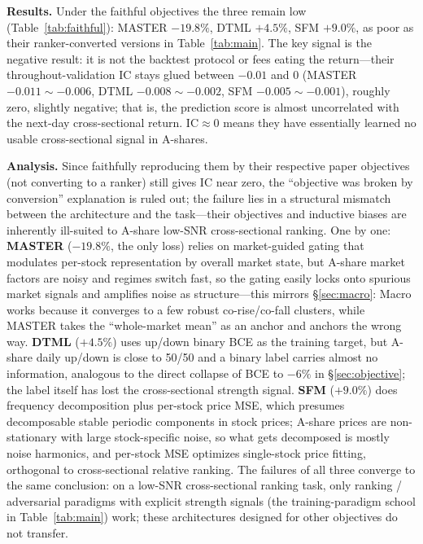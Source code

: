 \documentclass[a4paper,11pt]{article}
\begin{document}
\textbf{Results.} Under the faithful objectives the three remain low
(Table~\ref{tab:faithful}): MASTER $-19.8\%$, DTML $+4.5\%$, SFM $+9.0\%$, as
poor as their ranker-converted versions in Table~\ref{tab:main}. The key signal
is the negative result: it is not the backtest protocol or fees eating the
return---their throughout-validation IC stays glued between $-0.01$ and $0$
(MASTER $-0.011\sim-0.006$, DTML $-0.008\sim-0.002$, SFM $-0.005\sim-0.001$),
roughly zero, slightly negative; that is, the prediction score is almost
uncorrelated with the next-day cross-sectional return. IC$\approx 0$ means they
have essentially learned no usable cross-sectional signal in A-shares.

\textbf{Analysis.} Since faithfully reproducing them by their respective
paper objectives (not converting to a ranker) still gives IC near zero, the
``objective was broken by conversion'' explanation is ruled out; the failure
lies in a structural mismatch between the architecture and the task---their
objectives and inductive biases are inherently ill-suited to A-share low-SNR
cross-sectional ranking. One by one: \textbf{MASTER} ($-19.8\%$, the only loss)
relies on market-guided gating that modulates per-stock representation by
overall market state, but A-share market factors are noisy and regimes switch
fast, so the gating easily locks onto spurious market signals and amplifies
noise as structure---this mirrors \S\ref{sec:macro}: Macro works because it
converges to a few robust co-rise/co-fall clusters, while MASTER takes the
``whole-market mean'' as an anchor and anchors the wrong way. \textbf{DTML}
($+4.5\%$) uses up/down binary BCE as the training target, but A-share daily
up/down is close to 50/50 and a binary label carries almost no information,
analogous to the direct collapse of BCE to $-6\%$ in \S\ref{sec:objective}; the
label itself has lost the cross-sectional strength signal.
\textbf{SFM} ($+9.0\%$) does frequency decomposition plus per-stock price MSE,
which presumes decomposable stable periodic components in stock prices; A-share
prices are non-stationary with large stock-specific noise, so what gets
decomposed is mostly noise harmonics, and per-stock MSE optimizes single-stock
price fitting, orthogonal to cross-sectional relative ranking. The failures of
all three converge to the same conclusion: on a low-SNR cross-sectional ranking
task, only ranking / adversarial paradigms with explicit strength signals (the
training-paradigm school in Table~\ref{tab:main}) work; these architectures
designed for other objectives do not transfer.
\end{document}
